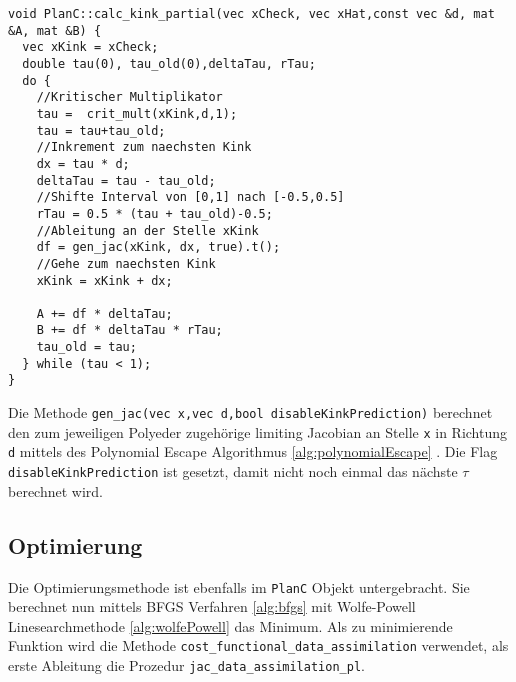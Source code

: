 \begin{lstlisting}[caption=Berechnung der gewichteten Ableitung, label=lst:kinkPartials]
void PlanC::calc_kink_partial(vec xCheck, vec xHat,const vec &d, mat &A, mat &B) {
  vec xKink = xCheck;
  double tau(0), tau_old(0),deltaTau, rTau;
  do {
    //Kritischer Multiplikator
    tau =  crit_mult(xKink,d,1);
    tau = tau+tau_old;
    //Inkrement zum naechsten Kink
    dx = tau * d;
    deltaTau = tau - tau_old;
    //Shifte Interval von [0,1] nach [-0.5,0.5]
    rTau = 0.5 * (tau + tau_old)-0.5;
    //Ableitung an der Stelle xKink
    df = gen_jac(xKink, dx, true).t();
    //Gehe zum naechsten Kink
    xKink = xKink + dx;

    A += df * deltaTau;
    B += df * deltaTau * rTau;
    tau_old = tau;
  } while (tau < 1);
}
\end{lstlisting}

Die Methode \texttt{gen\_jac(vec x,vec d,bool disableKinkPrediction)} berechnet den zum jeweiligen Polyeder zugehörige limiting Jacobian an Stelle \texttt{x} in Richtung \texttt{d} mittels des Polynomial Escape Algorithmus 
\ref{alg:polynomialEscape}
. Die Flag \texttt{disableKinkPrediction} ist gesetzt, damit nicht noch einmal das nächste $\tau$ berechnet wird.


\subsection{Optimierung}
Die Optimierungsmethode ist ebenfalls im \texttt{PlanC} Objekt untergebracht. Sie berechnet nun mittels BFGS Verfahren \ref{alg:bfgs} mit Wolfe-Powell Linesearchmethode \ref{alg:wolfePowell} das Minimum. 
Als zu minimierende Funktion wird die Methode \texttt{cost\_functional\_data\_assimilation} verwendet, als erste Ableitung die Prozedur \texttt{jac\_data\_assimilation\_pl}.

% 
